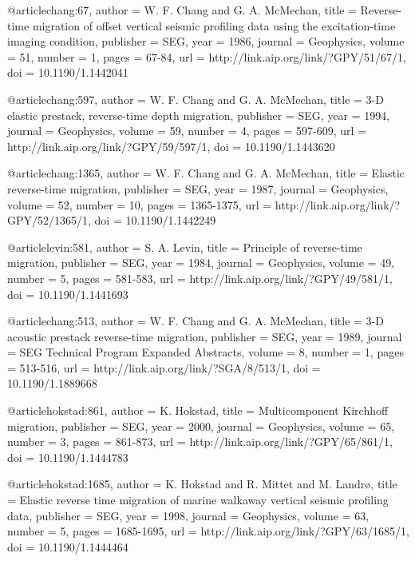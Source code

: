 @article{chang:67,
  author =	 {W. F. Chang and G. A. McMechan},
  title =	 {Reverse-time migration of offset vertical seismic
                  profiling data using the excitation-time imaging
                  condition},
  publisher =	 {SEG},
  year =	 1986,
  journal =	 {Geophysics},
  volume =	 51,
  number =	 1,
  pages =	 {67-84},
  url =		 {http://link.aip.org/link/?GPY/51/67/1},
  doi =		 {10.1190/1.1442041}
}

@article{chang:597,
  author =	 {W. F. Chang and G. A. McMechan},
  title =	 {3-{D} elastic prestack, reverse-time depth
                  migration},
  publisher =	 {SEG},
  year =	 1994,
  journal =	 {Geophysics},
  volume =	 59,
  number =	 4,
  pages =	 {597-609},
  url =		 {http://link.aip.org/link/?GPY/59/597/1},
  doi =		 {10.1190/1.1443620}
}

@article{chang:1365,
  author =	 {W. F. Chang and G. A. McMechan},
  title =	 {Elastic reverse-time migration},
  publisher =	 {SEG},
  year =	 1987,
  journal =	 {Geophysics},
  volume =	 52,
  number =	 10,
  pages =	 {1365-1375},
  url =		 {http://link.aip.org/link/?GPY/52/1365/1},
  doi =		 {10.1190/1.1442249}
}

@article{levin:581,
  author =	 {S. A. Levin},
  title =	 {Principle of reverse-time migration},
  publisher =	 {SEG},
  year =	 1984,
  journal =	 {Geophysics},
  volume =	 49,
  number =	 5,
  pages =	 {581-583},
  url =		 {http://link.aip.org/link/?GPY/49/581/1},
  doi =		 {10.1190/1.1441693}
}

@article{chang:513,
  author =	 {W. F. Chang and G. A. McMechan},
  title =	 {3-{D} acoustic prestack reverse-time migration},
  publisher =	 {SEG},
  year =	 1989,
  journal =	 {SEG Technical Program Expanded Abstracts},
  volume =	 8,
  number =	 1,
  pages =	 {513-516},
  url =		 {http://link.aip.org/link/?SGA/8/513/1},
  doi =		 {10.1190/1.1889668}
}

@article{hokstad:861,
  author =	 {K. Hokstad},
  title =	 {Multicomponent {K}irchhoff migration},
  publisher =	 {SEG},
  year =	 2000,
  journal =	 {Geophysics},
  volume =	 65,
  number =	 3,
  pages =	 {861-873},
  url =		 {http://link.aip.org/link/?GPY/65/861/1},
  doi =		 {10.1190/1.1444783}
}

@article{hokstad:1685,
  author =	 {K. Hokstad and R. Mittet and M. Landr\o},
  title =	 {Elastic reverse time migration of marine walkaway
                  vertical seismic profiling data},
  publisher =	 {SEG},
  year =	 1998,
  journal =	 {Geophysics},
  volume =	 63,
  number =	 5,
  pages =	 {1685-1695},
  url =		 {http://link.aip.org/link/?GPY/63/1685/1},
  doi =		 {10.1190/1.1444464}
}


